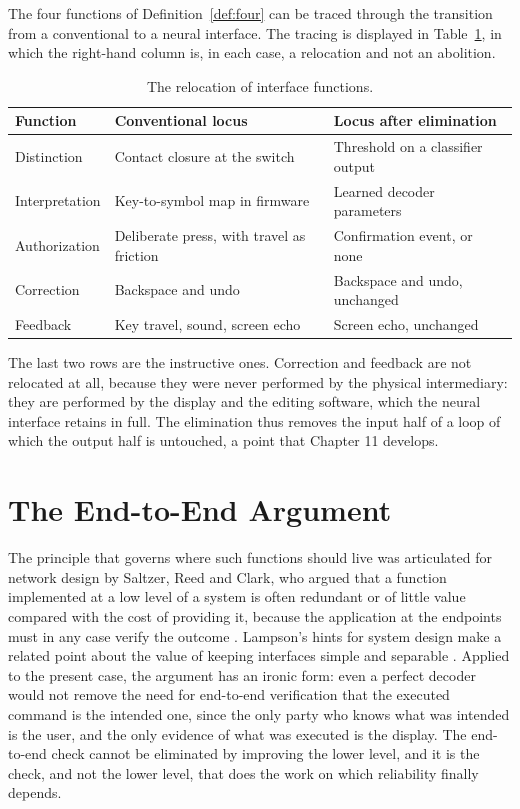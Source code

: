 \documentclass[11pt,twoside,openany]{book}
\theoremstyle{definition}
\theoremstyle{remark}
\begin{document}
The four functions of Definition~\ref{def:four} can be traced through the transition from a conventional to a neural interface. The tracing is displayed in Table~\ref{tab:reloc}, in which the right-hand column is, in each case, a relocation and not an abolition.

\begin{table}[ht]
\centering
\begin{tabular}{p{2.4cm}p{4.9cm}p{5.2cm}}
\toprule
Function & Conventional locus & Locus after elimination\\
\midrule
Distinction & Contact closure at the switch & Threshold on a classifier output\\
Interpretation & Key-to-symbol map in firmware & Learned decoder parameters\\
Authorization & Deliberate press, with travel as friction & Confirmation event, or none\\
Correction & Backspace and undo & Backspace and undo, unchanged\\
Feedback & Key travel, sound, screen echo & Screen echo, unchanged\\
\bottomrule
\end{tabular}
\caption{The relocation of interface functions.}\label{tab:reloc}
\end{table}

The last two rows are the instructive ones. Correction and feedback are not relocated at all, because they were never performed by the physical intermediary: they are performed by the display and the editing software, which the neural interface retains in full. The elimination thus removes the input half of a loop of which the output half is untouched, a point that Chapter 11 develops.

\section{The End-to-End Argument}

The principle that governs where such functions should live was articulated for network design by Saltzer, Reed and Clark, who argued that a function implemented at a low level of a system is often redundant or of little value compared with the cost of providing it, because the application at the endpoints must in any case verify the outcome \cite{saltzer1984}. Lampson's hints for system design make a related point about the value of keeping interfaces simple and separable \cite{lampson1983}. Applied to the present case, the argument has an ironic form: even a perfect decoder would not remove the need for end-to-end verification that the executed command is the intended one, since the only party who knows what was intended is the user, and the only evidence of what was executed is the display. The end-to-end check cannot be eliminated by improving the lower level, and it is the check, and not the lower level, that does the work on which reliability finally depends.
\end{document}
